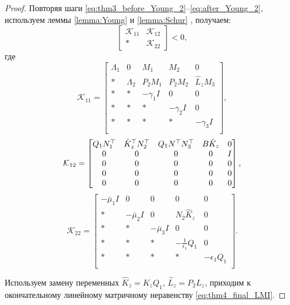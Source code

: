 \begin{proof}
Повторяя шаги \eqref{eq:thm3_before_Young_2}--\eqref{eq:after_Young_2}, 
используем леммы \ref{lemma:Young} и \ref{lemma:Schur} , получаем:
\begin{equation}
	\label{eq:thm4_final_LMI_var}
	\begin{bmatrix}
		\mathcal{K}_{11} & \mathcal{K}_{12} \\
		* & \mathcal{K}_{22}
	\end{bmatrix}<0,
\end{equation}
где
\begin{equation}
	\mathcal{K}_{11}= \begin{bmatrix}
		{\Lambda}_1 & 0 & {M}_1 & {M}_2&0  \\
		* & {\Lambda}_2 & {P}_2{M}_1 & {P}_2{M}_2 & \hat{{L}}_z{M}_3\\
		* & * & -\gamma_1{I} & 0&0\\
		* & * &*  & -\gamma_2{I} &0\\
		*& * & * &*  &-\gamma_3{I}\\
	\end{bmatrix},
\end{equation}
%
\begin{equation}
	\mathcal{K}_{12}= \begin{bmatrix}
		{Q}_1{N}_1^\top & \hat{{K}}_z^\top{N}_2^\top & {Q}_1 {N}^\top{N}_3^\top & {B}\hat{{K}}_z & 0\\
		0&0&0&0&I\\
		0&0& 0&0&0\\
		0&0&0& 0&0\\
		0&0&0&0&0\\
	\end{bmatrix},
\end{equation}
%
\begin{equation}
	\mathcal{K}_{22}=
	\begin{bmatrix}
		-\bar{\mu}_1{I}&0&0&0&0 \\
		*&-\bar{\mu}_2{I}& 0&{N}_2\hat{{K}}_z&0\\
		* & *&-\bar{\mu}_3{I}&0&0\\
		* & *&*&-\frac{1}{\epsilon_1}{Q}_1&0\\
		*&*&*&*&-\epsilon_1{Q}_1\\
	\end{bmatrix}.
\end{equation}%

Используем замену переменных $\hat{{K}}_z={K}_z{Q}_1$, $\hat{{L}}_z={P}_2{L}_z$, приходим к окончательному линейному матричному неравенству \eqref{eq:thm4_final_LMI}.
\end{proof}
